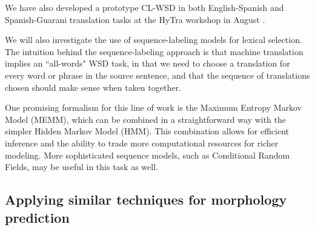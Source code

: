 We have also developed a prototype
CL-WSD in both English-Spanish and Spanish-Guarani translation tasks at the
HyTra workshop in August \cite{rudnick-gasser:2013:HyTra-2013}.

We will also investigate the use of sequence-labeling models for
lexical selection.  The intuition behind the sequence-labeling approach is that
machine translation implies an ``all-words" WSD task, in that we need to choose
a translation for every word or phrase in the source sentence, and that the
sequence of translations chosen should make sense when taken together.

One promising formalism for this line of work is the Maximum
Entropy Markov Model (MEMM), which can be combined in a straightforward way
with the simpler Hidden Markov Model (HMM). This combination allows for
efficient inference and the ability to trade more computational resources for
richer modeling. More sophisticated sequence models, such as Conditional Random
Fields, may be useful in this task as well.


\subsection{Applying similar techniques for morphology prediction}
